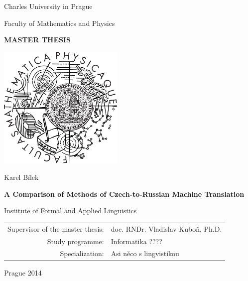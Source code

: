 \documentclass[12pt,a4paper]{report}
\begin{document}


\pagestyle{empty}
\begin{center}

\large

Charles University in Prague

\medskip

Faculty of Mathematics and Physics

\vfill

{\bf\Large MASTER THESIS}

\vfill

\centerline{\mbox{\includegraphics[width=60mm]{../img/logo.pdf}}}

\vfill
\vspace{5mm}

{\LARGE Karel Bílek}

\vspace{15mm}

{\LARGE\bfseries A Comparison of Methods of Czech-to-Russian Machine Translation}

\vfill

Institute of Formal and Applied Linguistics

\vfill

\begin{tabular}{rl}

Supervisor of the master thesis: & doc. RNDr. Vladislav Kuboň, Ph.D. \\
\noalign{\vspace{2mm}}
Study programme: & Informatika  ????  \\
\noalign{\vspace{2mm}}
Specialization: & Asi něco s lingvistikou \\
\end{tabular}

\vfill

Prague 2014

\end{center}
\end{document}
